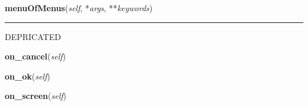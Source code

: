     \label{npyscreen:Form:Form:menuOfMenus}
    
    \vspace{0.5ex}

    \begin{boxedminipage}{\textwidth}

    \raggedright \textbf{menuOfMenus}(\textit{self}, *\textit{args}, **\textit{keywords})

    \vspace{-1.5ex}

    \rule{\textwidth}{0.5\fboxrule}
    DEPRICATED

    \vspace{1ex}

    \end{boxedminipage}

    \label{npyscreen:ActionForm':ActionForm:on_cancel}

    \vspace{0.5ex}

    \begin{boxedminipage}{\textwidth}

    \raggedright \textbf{on\_cancel}(\textit{self})

    \end{boxedminipage}

    \label{npyscreen:ActionForm':ActionForm:on_ok}

    \vspace{0.5ex}

    \begin{boxedminipage}{\textwidth}

    \raggedright \textbf{on\_ok}(\textit{self})

    \end{boxedminipage}

    \label{npyscreen:Form:Form:on_screen}
    
    \vspace{0.5ex}

    \begin{boxedminipage}{\textwidth}

    \raggedright \textbf{on\_screen}(\textit{self})

    \end{boxedminipage}


